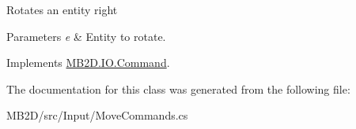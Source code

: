 Rotates an entity right 


\begin{DoxyParams}{Parameters}
{\em e} & Entity to rotate.\\
\hline
\end{DoxyParams}


Implements \hyperlink{class_m_b2_d_1_1_i_o_1_1_command_ae927e36c0e285848325cc68eddb5fd72}{M\+B2\+D.\+I\+O.\+Command}.



The documentation for this class was generated from the following file\+:\begin{DoxyCompactItemize}
\item 
M\+B2\+D/src/\+Input/Move\+Commands.\+cs\end{DoxyCompactItemize}
